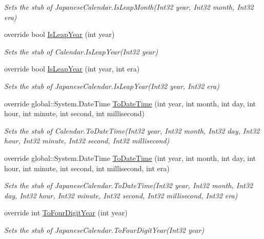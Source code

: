 \begin{DoxyCompactItemize}
\begin{DoxyCompactList}\small\item\em Sets the stub of Japanese\-Calendar.\-Is\-Leap\-Month(\-Int32 year, Int32 month, Int32 era)\end{DoxyCompactList}\item 
override bool \hyperlink{class_system_1_1_globalization_1_1_fakes_1_1_stub_japanese_calendar_ac5bac001064be7003341a1c530c7fda9}{Is\-Leap\-Year} (int year)
\begin{DoxyCompactList}\small\item\em Sets the stub of Calendar.\-Is\-Leap\-Year(\-Int32 year)\end{DoxyCompactList}\item 
override bool \hyperlink{class_system_1_1_globalization_1_1_fakes_1_1_stub_japanese_calendar_a4824c85386a5f0fcdf56d6e940ed9832}{Is\-Leap\-Year} (int year, int era)
\begin{DoxyCompactList}\small\item\em Sets the stub of Japanese\-Calendar.\-Is\-Leap\-Year(\-Int32 year, Int32 era)\end{DoxyCompactList}\item 
override global\-::\-System.\-Date\-Time \hyperlink{class_system_1_1_globalization_1_1_fakes_1_1_stub_japanese_calendar_a90488de190f7041890f8527c3655d52b}{To\-Date\-Time} (int year, int month, int day, int hour, int minute, int second, int millisecond)
\begin{DoxyCompactList}\small\item\em Sets the stub of Calendar.\-To\-Date\-Time(\-Int32 year, Int32 month, Int32 day, Int32 hour, Int32 minute, Int32 second, Int32 millisecond)\end{DoxyCompactList}\item 
override global\-::\-System.\-Date\-Time \hyperlink{class_system_1_1_globalization_1_1_fakes_1_1_stub_japanese_calendar_a156b9cf4944efe052d256d662da2894c}{To\-Date\-Time} (int year, int month, int day, int hour, int minute, int second, int millisecond, int era)
\begin{DoxyCompactList}\small\item\em Sets the stub of Japanese\-Calendar.\-To\-Date\-Time(\-Int32 year, Int32 month, Int32 day, Int32 hour, Int32 minute, Int32 second, Int32 millisecond, Int32 era)\end{DoxyCompactList}\item 
override int \hyperlink{class_system_1_1_globalization_1_1_fakes_1_1_stub_japanese_calendar_a5ead0557489de7b06695432b9c11de8b}{To\-Four\-Digit\-Year} (int year)
\begin{DoxyCompactList}\small\item\em Sets the stub of Japanese\-Calendar.\-To\-Four\-Digit\-Year(\-Int32 year)\end{DoxyCompactList}\end{DoxyCompactItemize}
